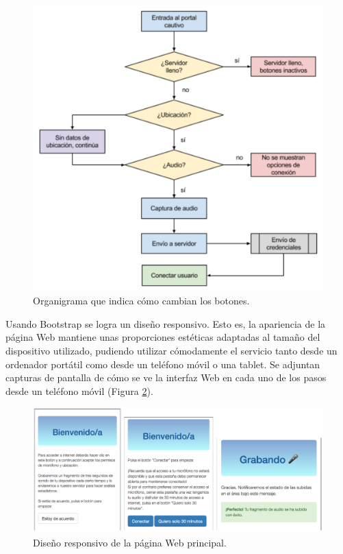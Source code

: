 \begin{figure}[!t]
\begin{center}
\includegraphics[width=0.75\linewidth]{./5_AnalisisOrganico/Img/flujoBotones.png}
\end{center}
\caption{Organigrama que indica cómo cambian los botones.}
\label{flujoBotones}
\end{figure}

Usando Bootstrap se logra un diseño responsivo. Esto es, la apariencia de la página Web mantiene unas proporciones estéticas adaptadas al tamaño del dispositivo utilizado, pudiendo utilizar cómodamente el servicio tanto desde un ordenador portátil como desde un teléfono móvil o una tablet. Se adjuntan capturas de pantalla de cómo se ve la interfaz Web en cada uno de los pasos desde un teléfono móvil (Figura \ref{responsiveDesign}).

\begin{figure}[!t]
\begin{center}
\includegraphics[width=0.75\linewidth]{./5_AnalisisOrganico/Img/responsiveDesign.png}
\end{center}
\caption{Diseño responsivo de la página Web principal.}
\label{responsiveDesign}
\end{figure}

